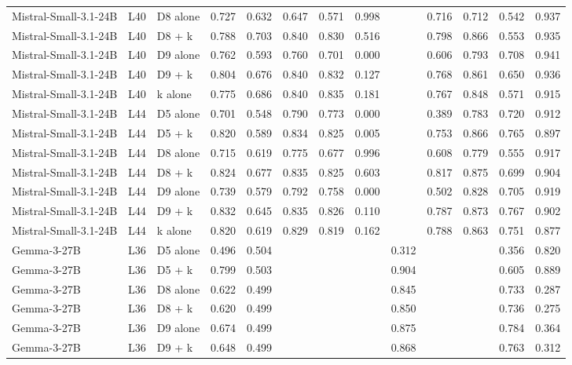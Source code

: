\begin{table}
\begin{tabular}{lllrrrrrrrrrr}
Mistral-Small-3.1-24B & L40 & D8 alone & 0.727 & 0.632 & 0.647 & 0.571 & 0.998 &  & 0.716 & 0.712 & 0.542 & 0.937 \\
Mistral-Small-3.1-24B & L40 & D8 + k & 0.788 & 0.703 & 0.840 & 0.830 & 0.516 &  & 0.798 & 0.866 & 0.553 & 0.935 \\
Mistral-Small-3.1-24B & L40 & D9 alone & 0.762 & 0.593 & 0.760 & 0.701 & 0.000 &  & 0.606 & 0.793 & 0.708 & 0.941 \\
Mistral-Small-3.1-24B & L40 & D9 + k & 0.804 & 0.676 & 0.840 & 0.832 & 0.127 &  & 0.768 & 0.861 & 0.650 & 0.936 \\
Mistral-Small-3.1-24B & L40 & k alone & 0.775 & 0.686 & 0.840 & 0.835 & 0.181 &  & 0.767 & 0.848 & 0.571 & 0.915 \\
Mistral-Small-3.1-24B & L44 & D5 alone & 0.701 & 0.548 & 0.790 & 0.773 & 0.000 &  & 0.389 & 0.783 & 0.720 & 0.912 \\
Mistral-Small-3.1-24B & L44 & D5 + k & 0.820 & 0.589 & 0.834 & 0.825 & 0.005 &  & 0.753 & 0.866 & 0.765 & 0.897 \\
Mistral-Small-3.1-24B & L44 & D8 alone & 0.715 & 0.619 & 0.775 & 0.677 & 0.996 &  & 0.608 & 0.779 & 0.555 & 0.917 \\
Mistral-Small-3.1-24B & L44 & D8 + k & 0.824 & 0.677 & 0.835 & 0.825 & 0.603 &  & 0.817 & 0.875 & 0.699 & 0.904 \\
Mistral-Small-3.1-24B & L44 & D9 alone & 0.739 & 0.579 & 0.792 & 0.758 & 0.000 &  & 0.502 & 0.828 & 0.705 & 0.919 \\
Mistral-Small-3.1-24B & L44 & D9 + k & 0.832 & 0.645 & 0.835 & 0.826 & 0.110 &  & 0.787 & 0.873 & 0.767 & 0.902 \\
Mistral-Small-3.1-24B & L44 & k alone & 0.820 & 0.619 & 0.829 & 0.819 & 0.162 &  & 0.788 & 0.863 & 0.751 & 0.877 \\
Gemma-3-27B & L36 & D5 alone & 0.496 & 0.504 &  &  &  & 0.312 &  &  & 0.356 & 0.820 \\
Gemma-3-27B & L36 & D5 + k & 0.799 & 0.503 &  &  &  & 0.904 &  &  & 0.605 & 0.889 \\
Gemma-3-27B & L36 & D8 alone & 0.622 & 0.499 &  &  &  & 0.845 &  &  & 0.733 & 0.287 \\
Gemma-3-27B & L36 & D8 + k & 0.620 & 0.499 &  &  &  & 0.850 &  &  & 0.736 & 0.275 \\
Gemma-3-27B & L36 & D9 alone & 0.674 & 0.499 &  &  &  & 0.875 &  &  & 0.784 & 0.364 \\
Gemma-3-27B & L36 & D9 + k & 0.648 & 0.499 &  &  &  & 0.868 &  &  & 0.763 & 0.312 \\

\end{tabular}
\end{table}
